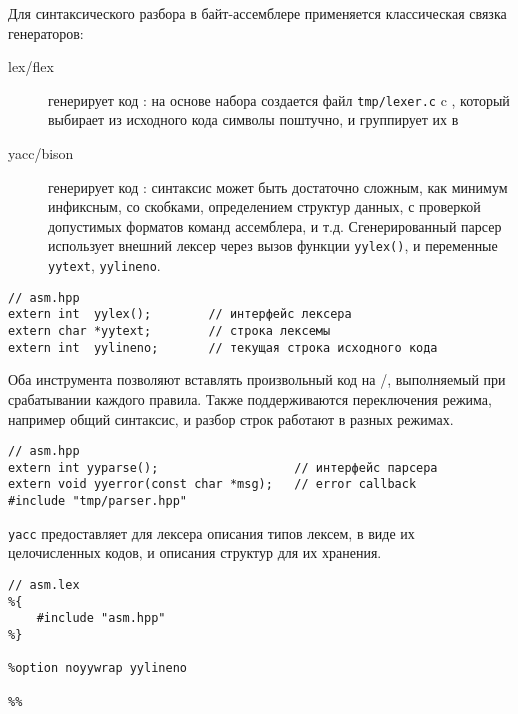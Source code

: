 \clearpage
{}

Для синтаксического разбора в байт-ассемблере применяется классическая связка
генераторов:
\begin{description}
    \item[lex/flex] генерирует код : на основе набора
     создается файл \verb|tmp/lexer.c| c
    , который выбирает из исходного кода символы
    поштучно, и группирует их в 
    \item[yacc/bison] генерирует код : синтаксис может быть
    достаточно сложным, как минимум инфиксным, со скобками, определением
    структур данных, с проверкой допустимых форматов команд ассемблера, и т.д.
    Сгенерированный парсер использует внешний лексер через вызов функции
    \verb|yylex()|, и переменные \verb|yytext|, \verb|yylineno|.
\end{description}

\begin{verbatim}// asm.hpp
extern int  yylex();        // интерфейс лексера
extern char *yytext;        // строка лексемы
extern int  yylineno;       // текущая строка исходного кода
\end{verbatim}

Оба инструмента позволяют вставлять произвольный код на \ci/\cpp, выполняемый
при срабатывании каждого правила. Также поддерживаются переключения режима,
например общий синтаксис, и разбор строк работают в разных режимах.

\begin{verbatim}// asm.hpp
extern int yyparse();                   // интерфейс парсера
extern void yyerror(const char *msg);   // error callback
#include "tmp/parser.hpp"
\end{verbatim}

\verb|yacc| предоставляет для лексера описания типов лексем, в виде их
целочисленных кодов, и описания структур для их хранения.

\begin{verbatim}// asm.lex
%{
    #include "asm.hpp"
%}

%option noyywrap yylineno

%%
\end{verbatim}
